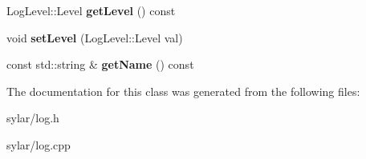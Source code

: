 \begin{DoxyCompactItemize}
\item 
\hypertarget{classsylar_1_1Logger_a036c8a10712161538a5560fe7bf3b0d3}{Log\-Level\-::\-Level {\bfseries get\-Level} () const }\label{classsylar_1_1Logger_a036c8a10712161538a5560fe7bf3b0d3}

\item 
\hypertarget{classsylar_1_1Logger_a541502ab0661d82c220e8cbfc09d6424}{void {\bfseries set\-Level} (Log\-Level\-::\-Level val)}\label{classsylar_1_1Logger_a541502ab0661d82c220e8cbfc09d6424}

\item 
\hypertarget{classsylar_1_1Logger_a9a98bc9ac8e4b359690530eefba8b3e5}{const std\-::string \& {\bfseries get\-Name} () const }\label{classsylar_1_1Logger_a9a98bc9ac8e4b359690530eefba8b3e5}

\end{DoxyCompactItemize}


The documentation for this class was generated from the following files\-:\begin{DoxyCompactItemize}
\item 
sylar/log.\-h\item 
sylar/log.\-cpp\end{DoxyCompactItemize}
